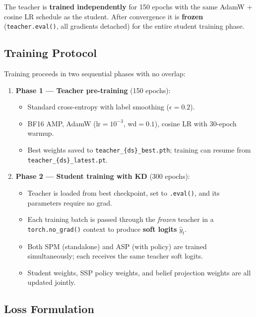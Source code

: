 \documentclass[11pt,a4paper]{article}
\begin{document}
The teacher is \textbf{trained independently} for 150 epochs with the same AdamW + cosine LR schedule as the student. After convergence it is \textbf{frozen} (\texttt{teacher.eval()}, all gradients detached) for the entire student training phase.

\subsection{Training Protocol}

Training proceeds in two sequential phases with no overlap:

\begin{enumerate}
  \item \textbf{Phase 1 — Teacher pre-training} (150 epochs):
    \begin{itemize}
      \item Standard cross-entropy with label smoothing ($\epsilon=0.2$).
      \item BF16 AMP, AdamW ($\text{lr}=10^{-3}$, $\text{wd}=0.1$), cosine LR with 30-epoch warmup.
      \item Best weights saved to \texttt{teacher\_\{ds\}\_best.pth}; training can resume from \texttt{teacher\_\{ds\}\_latest.pt}.
    \end{itemize}
  \item \textbf{Phase 2 — Student training with KD} (300 epochs):
    \begin{itemize}
      \item Teacher is loaded from best checkpoint, set to \texttt{.eval()}, and its parameters require no grad.
      \item Each training batch is passed through the \emph{frozen} teacher in a \texttt{torch.no\_grad()} context to produce \textbf{soft logits} $\hat{y}_t$.
      \item Both SPM (standalone) and ASP (with policy) are trained simultaneously; each receives the same teacher soft logits.
      \item Student weights, SSP policy weights, and belief projection weights are all updated jointly.
    \end{itemize}
\end{enumerate}

\subsection{Loss Formulation}
\end{document}
